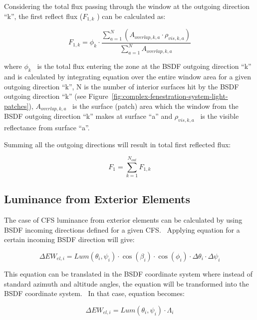 Considering the total flux passing through the window at the outgoing direction ``k'', the first reflect flux (\({F_{1,k}}\) ) can be calculated as:

\begin{equation}
{F_{1,k}} = {\phi_k} \cdot \frac{{\sum\limits_{a = 1}^N {({A_{overlap,k,a}} \cdot {\rho_{vis,k,a}})} }}{{\sum\limits_{a = 1}^N {{A_{overlap,k,a}}} }}
\end{equation}

where \({\phi_k}\) ~is the total flux entering the zone at the BSDF outgoing direction ``k'' and is calculated by integrating equation over the entire window area for a given outgoing direction ``k'', N is the number of interior surfaces hit by the BSDF outgoing direction ``k'' (see Figure~\ref{fig:complex-fenestration-system-light-patches}), \({A_{overlap,k,a}}\) ~is the surface (patch) area which the window from the BSDF outgoing direction ``k'' makes at surface ``a'' and \({\rho_{vis,k,a}}\) ~is the visible reflectance from surface ``a''.

Summing all the outgoing directions will result in total first reflected flux:

\begin{equation}
{F_1} = \sum\limits_{k = 1}^{{N_{out}}} {{F_{1,k}}}
\end{equation}

\subsection{Luminance from Exterior Elements}\label{luminance-from-exterior-elements}

The case of CFS luminance from exterior elements can be calculated by using BSDF incoming directions defined for a given CFS.~ Applying equation for a certain incoming BSDF direction will give:

\begin{equation}
\Delta E{W_{el,i}} = Lum({\theta_i},{\psi_i}) \cdot \cos ({\beta_i}) \cdot \cos ({\phi_i}) \cdot \Delta {\theta_i} \cdot \Delta {\psi_i}
\end{equation}

This equation can be translated in the BSDF coordinate system where instead of standard azimuth and altitude angles, the equation will be transformed into the BSDF coordinate system.~ In that case, equation becomes:

\begin{equation}
\Delta E{W_{el,i}} = Lum({\theta_i},{\psi_i}) \cdot {\Lambda_i}
\end{equation}

